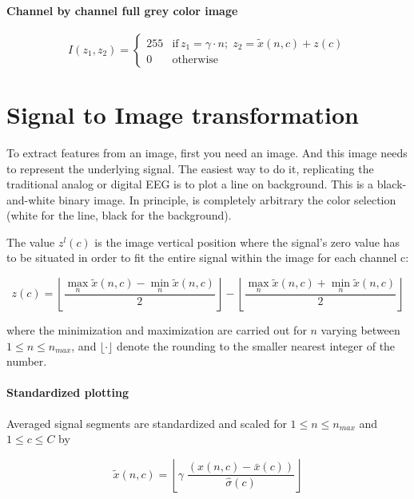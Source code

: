 \paragraph{Channel by channel full grey color image}
\begin{equation}
I(z_1,z_2) = \left\{ \begin{array}{rl}
255 & \text{if} \,  z_1 = \gamma \cdot n; \; z_2 = \tilde{x}(n,c) + z(c) \\
0   & \mbox{otherwise}
\end{array}\right.
\label{eq:images}
\end{equation}

\section{Signal to Image transformation}

To extract features from an image, first you need an image.  And this image needs to represent the underlying signal.  The easiest way to do it, replicating the traditional analog or digital EEG is to plot a line on background.  This is a black-and-white binary image.  In principle, is completely arbitrary the color selection (white for the line, black for the background).

The value $z^l(c)$ is the image vertical position where the signal's zero value has to be situated in order to fit the entire signal within the image for each channel c:

\begin{equation}
z(c) = \left \lfloor{ \frac{\max_{n} \tilde{x}(n,c)  - \min_{n} \tilde{x}(n,c) }{2} }\right \rfloor -   \left \lfloor{ \frac{\max_{n} \tilde{x}(n,c)  + \min_{n} \tilde{x}(n,c)}{ 2} }\right \rfloor
\label{eq:zerolevel}
\end{equation}

\noindent where the minimization and maximization are carried out for $n$ varying between ${1 \leq n\leq n_{max}}$, and $ \lfloor \cdot  \rfloor $ denote the rounding to the smaller nearest integer of the number.


\paragraph{Standardized plotting}

Averaged signal segments are standardized and scaled for $1 \leq n \leq n_{max}$ and $1 \leq c \leq C$ by 

\begin{equation}
\tilde{x}(n,c) = \left \lfloor{ \gamma \; \frac{( x(n,c) - \bar{x}(c)  )}{ \hat{\sigma}(c) } }\right \rfloor
\label{eq:standarizedaverages}
\end{equation}

